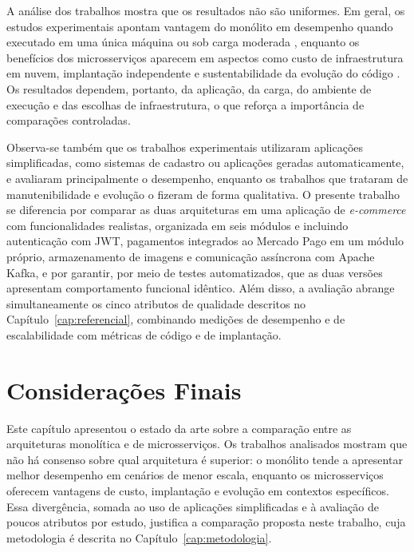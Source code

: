 A análise dos trabalhos mostra que os resultados não são uniformes. Em geral, os estudos
experimentais apontam vantagem do monólito em desempenho quando executado em uma única máquina
ou sob carga moderada \cite{aldebagy2018, blinowski2022, vale2025}, enquanto os benefícios dos
microsserviços aparecem em aspectos como custo de infraestrutura em nuvem, implantação
independente e sustentabilidade da evolução do código \cite{villamizar2016, mendes2021}. Os
resultados dependem, portanto, da aplicação, da carga, do ambiente de execução e das escolhas
de infraestrutura, o que reforça a importância de comparações controladas.

Observa-se também que os trabalhos experimentais utilizaram aplicações simplificadas, como
sistemas de cadastro ou aplicações geradas automaticamente, e avaliaram principalmente o
desempenho, enquanto os trabalhos que trataram de manutenibilidade e evolução o fizeram de
forma qualitativa. O presente trabalho se diferencia por comparar as duas arquiteturas em uma
aplicação de \textit{e-commerce} com funcionalidades realistas, organizada em seis módulos e
incluindo autenticação com JWT, pagamentos integrados ao Mercado Pago em um módulo próprio,
armazenamento de imagens e comunicação assíncrona com Apache Kafka, e por garantir, por meio
de testes automatizados, que as duas versões apresentam comportamento funcional idêntico. Além
disso, a avaliação abrange simultaneamente os cinco atributos de qualidade descritos no
Capítulo~\ref{cap:referencial}, combinando medições de desempenho e de escalabilidade com
métricas de código e de implantação.

\section{Considerações Finais}

Este capítulo apresentou o estado da arte sobre a comparação entre as arquiteturas monolítica
e de microsserviços. Os trabalhos analisados mostram que não há consenso sobre qual
arquitetura é superior: o monólito tende a apresentar melhor desempenho em cenários de menor
escala, enquanto os microsserviços oferecem vantagens de custo, implantação e evolução em
contextos específicos. Essa divergência, somada ao uso de aplicações simplificadas e à
avaliação de poucos atributos por estudo, justifica a comparação proposta neste trabalho, cuja
metodologia é descrita no Capítulo~\ref{cap:metodologia}.
